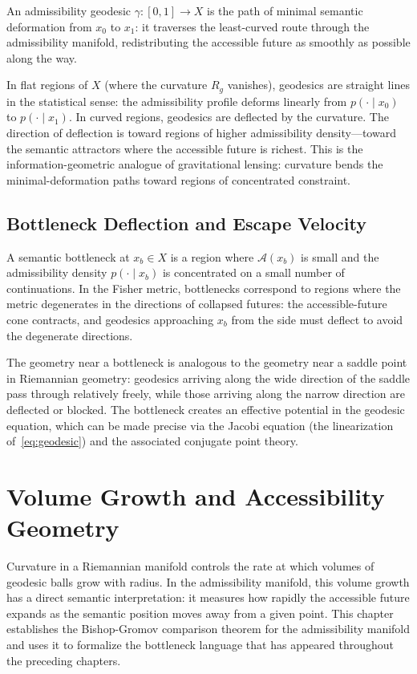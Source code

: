 \documentclass[12pt, oneside]{book}
\theoremstyle{plain-flyxion}
\theoremstyle{definition-flyxion}
\newcommand{\A}{\mathcal{A}}
\begin{document}
An admissibility geodesic $\gamma: [0,1] \to X$ is the path of minimal semantic
deformation from $x_0$ to $x_1$: it traverses the least-curved route through the
admissibility manifold, redistributing the accessible future as smoothly as possible
along the way.

In flat regions of $X$ (where the curvature $R_g$ vanishes), geodesics are straight lines
in the statistical sense: the admissibility profile deforms linearly from $p(\cdot\mid
x_0)$ to $p(\cdot\mid x_1)$. In curved regions, geodesics are deflected by the curvature.
The direction of deflection is toward regions of higher admissibility density---toward
the semantic attractors where the accessible future is richest. This is the information-geometric
analogue of gravitational lensing: curvature bends the minimal-deformation paths toward
regions of concentrated constraint.

\section{Bottleneck Deflection and Escape Velocity}

A semantic bottleneck at $x_b \in X$ is a region where $\A(x_b)$ is small and the
admissibility density $p(\cdot\mid x_b)$ is concentrated on a small number of
continuations. In the Fisher metric, bottlenecks correspond to regions where the metric
degenerates in the directions of collapsed futures: the accessible-future cone contracts,
and geodesics approaching $x_b$ from the side must deflect to avoid the degenerate
directions.

The geometry near a bottleneck is analogous to the geometry near a saddle point in
Riemannian geometry: geodesics arriving along the wide direction of the saddle pass
through relatively freely, while those arriving along the narrow direction are deflected
or blocked. The bottleneck creates an effective potential in the geodesic equation, which
can be made precise via the Jacobi equation (the linearization of~\eqref{eq:geodesic})
and the associated conjugate point theory.

\chapter{Volume Growth and Accessibility Geometry}

Curvature in a Riemannian manifold controls the rate at which volumes of geodesic balls
grow with radius. In the admissibility manifold, this volume growth has a direct semantic
interpretation: it measures how rapidly the accessible future expands as the semantic
position moves away from a given point. This chapter establishes the Bishop-Gromov
comparison theorem for the admissibility manifold and uses it to formalize the bottleneck
language that has appeared throughout the preceding chapters.
\end{document}

